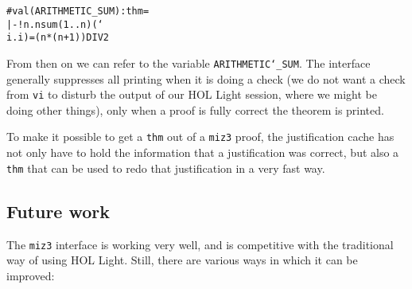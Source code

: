 \documentclass{LMCS}
\let\xmedskip=\medskip
\def\lam{\char`\\}
\def\}{\char`\}}
\begin{document}
\xmedskip
\begin{alltt}\small
# val ( ARITHMETIC_SUM ) : thm =
  |- !n. nsum (1..n) ({\lam}i. i) = (n * (n + 1)) DIV 2
\end{alltt}
\xmedskip

\noindent
From then on we can refer to the variable \texttt{ARITHMETIC\char`\_SUM}.
The interface generally suppresses all printing when it is
doing a check
(we do not want a check from \texttt{vi}
to disturb the output of our HOL Light session, where we might be
doing other things),
only when a proof is fully correct the theorem is printed.

To make it possible to get a \texttt{thm} out of a \texttt{miz3} proof,
the justification cache has not only have to hold the
information that a justification was correct, but also a \texttt{thm}
that can be used to redo that justification in a very fast way.


\subsection{Future work}
\label{improvements}

\noindent
The \texttt{miz3} interface is working very well, and is competitive
with the traditional way of using HOL Light.
Still, there are various ways in which it can be improved:
\end{document}

